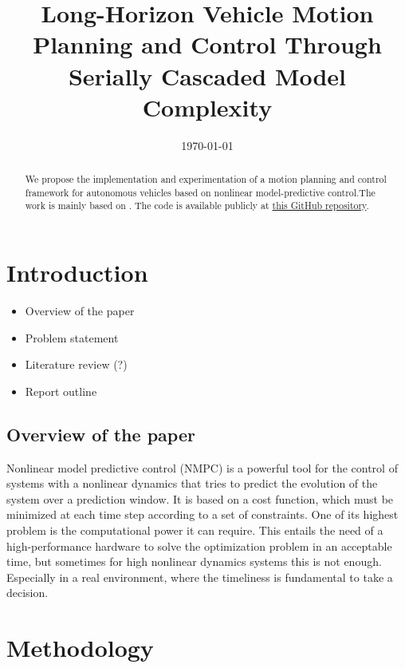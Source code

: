 \documentclass[a4paper, twocolumn, 11pt, twoside]{article}
\title{Long-Horizon Vehicle Motion Planning and Control Through Serially Cascaded Model Complexity}
\author{}
\date{\today}
\begin{document}
\maketitle

\begin{abstract}
    We propose the implementation and experimentation of a motion planning and
    control framework for autonomous vehicles based on nonlinear
    model-predictive control.The work is mainly based on \cite{paper}. The code is available publicly at
    \href{https://github.com/neverorfrog/vehicle-control}{this GitHub
    repository}. 
\end{abstract}


\section{Introduction}

\begin{itemize}
    \item Overview of the paper
    \item Problem statement
    \item Literature review (?)
    \item Report outline
\end{itemize}

\subsection*{Overview of the paper}


Nonlinear model predictive control (NMPC) is a powerful tool for the control of systems with a nonlinear dynamics 
that tries to predict the evolution of the system over a prediction window. It is based on a cost function, which must
be minimized at each time step according to a set of constraints.
One of its highest problem is the computational power it can require. This entails the need of a high-performance hardware
to solve the optimization problem in an acceptable time, but sometimes for high nonlinear dynamics systems this is not enough.
Especially in a real environment, where the timeliness is fundamental to take a decision.

\section{Methodology}
\end{document}
